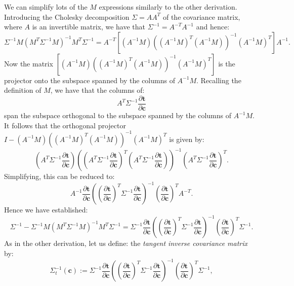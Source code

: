 \documentclass[withindex,glossary]{cam-thesis}
\renewcommand{\vec}[1]{\textbf{#1}} %
\begin{document}
We can simplify lots of the $M$ expressions similarly to the other derivation. Introducing the Cholesky decomposition $\Sigma = AA^T$ of the covariance matrix, where $A$ is an invertible matrix, we have that $\Sigma^{-1} = A^{-T} A^{-1}$ and hence:
\begin{equation}
\Sigma^{-1} M (M^T \Sigma^{-1} M)^{-1} M^T \Sigma^{-1} = A^{-T} \left[ (A^{-1}M) ((A^{-1}M)^T(A^{-1}M))^{-1} (A^{-1}M)^T \right] A^{-1}.
\end{equation}
Now the matrix $\left[ (A^{-1}M) ((A^{-1}M)^T(A^{-1}M))^{-1} (A^{-1}M)^T \right]$ is the projector onto the subspace spanned by the columns of $A^{-1}M$. Recalling the definition of $M$, we have that the columns of:
\begin{equation}
A^T \Sigma^{-1} \frac{\partial \vec{t}}{\partial \vec{c}}
\end{equation}
span the subspace orthogonal to the subspace spanned by the columns of $A^{-1} M$. It follows that the orthogonal projector $I - (A^{-1}M) ((A^{-1}M)^T(A^{-1}M))^{-1} (A^{-1}M)^T$ is given by:
\begin{equation}
\left(A^T \Sigma^{-1} \frac{\partial \vec{t}}{\partial \vec{c}} \right) \left( \left(A^T \Sigma^{-1} \frac{\partial \vec{t}}{\partial \vec{c}}\right)^T \left( A^T \Sigma^{-1} \frac{\partial \vec{t}}{\partial \vec{c}} \right) \right)^{-1} \left( A^T \Sigma^{-1} \frac{\partial \vec{t}}{\partial \vec{c}} \right)^T.
\end{equation}
Simplifying, this can be reduced to:
\begin{equation}
A^{-1} \frac{\partial \vec{t}}{\partial \vec{c}} \left( \left( \frac{\partial \vec{t}}{\partial \vec{c}} \right)^T \Sigma^{-1} \frac{\partial \vec{t}}{\partial \vec{c}}  \right)^{-1} \left( \frac{\partial \vec{t}}{\partial \vec{c}} \right)^T A^{-T}.
\end{equation}
Hence we have established:
\begin{equation}
\Sigma^{-1} - \Sigma^{-1} M (M^T\Sigma^{-1}M)^{-1} M^T \Sigma^{-1} = \Sigma^{-1} \frac{\partial \vec{t}}{\partial \vec{c}} \left( \left( \frac{\partial \vec{t}}{\partial \vec{c}} \right)^T \Sigma^{-1} \frac{\partial \vec{t}}{\partial \vec{c}}  \right)^{-1} \left( \frac{\partial \vec{t}}{\partial \vec{c}} \right)^T \Sigma^{-1}.
\end{equation}
As in the other derivation, let us define:
 the \textit{tangent inverse covariance matrix} by:
\begin{equation}
\Sigma^{-1}_t(\vec{c}) := \Sigma^{-1} \frac{\partial \vec{t}}{\partial \vec{c}} \left( \left(\frac{\partial \vec{t}}{\partial \vec{c}} \right)^T \Sigma^{-1} \frac{\partial \vec{t}}{\partial \vec{c}} \right)^{-1} \left( \frac{\partial \vec{t}}{\partial \vec{c}} \right)^T \Sigma^{-1},
\end{equation}
\end{document}
